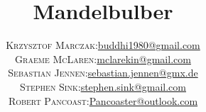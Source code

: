 % 
%





\newcommand{\mTitle}{Mandelbulber}
\newcommand{\mSubtitle}{User Manual}
\newcommand{\mVersionDocument}{2.35.0.0}
\newcommand{\mDateDocument}{2026-November}
\newcommand{\mAuthor}{	
\begin{tabular}{r|p{11cm}}
	\textsc{Krzysztof Marczak:}
		& \href{mailto:buddhi1980@gmail.com}
		{buddhi1980@gmail.com} \\
	\textsc{Graeme McLaren:}
		& \href{mailto:mclarekin@gmail.com}
		{mclarekin@gmail.com} \\
	\textsc{Sebastian Jennen:}
		& \href{mailto:sebastian.jennen@gmx.de}
		{sebastian.jennen@gmx.de} \\
	\textsc{Stephen Sink:}
		& \href{mailto:stephen.sink@gmail.com}
		{stephen.sink@gmail.com} \\
	\textsc{Robert Pancoast:}
		& \href{mailto:Pancoaster@outlook.com}
		{Pancoaster@outlook.com}
\end{tabular}}


\title{\mTitle}
\author{\mAuthor}




